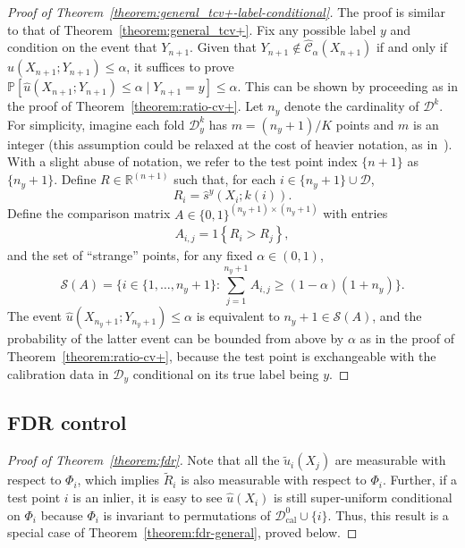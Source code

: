 \documentclass[11pt]{article}
\renewcommand{\P}[1]{\mathbb{P}\left[#1\right]}
\begin{document}
\begin{proof}[Proof of Theorem~\ref{theorem:general_tcv+-label-conditional}]
The proof is similar to that of Theorem~\ref{theorem:general_tcv+}.
Fix any possible label $y$ and condition on the event that $Y_{n+1}$.
Given that $Y_{n+1} \notin \hat{\mathcal{C}}_{\alpha}(X_{n+1})$  if and only if $\hat{u}(X_{n+1}; Y_{n+1}) \leq \alpha$, it suffices to prove $\P{\hat{u}(X_{n+1}; Y_{n+1}) \leq \alpha \mid Y_{n+1} = y} \leq \alpha$. This can be shown by proceeding as in the proof of Theorem~\ref{theorem:ratio-cv+}.
Let $n_y$ denote the cardinality of $\mathcal{D}^k$.
For simplicity, imagine each fold $\mathcal{D}^k_y$ has $m=(n_y+1)/K$ points and $m$ is an integer (this assumption could be relaxed at the cost of heavier notation, as in~\cite{barber2019predictive}).
With a slight abuse of notation, we refer to the test point index $\{n+1\}$ as $\{n_y+1\}$.
Define $R \in \mathbb{R}^{(n+1)}$ such that, for each $i \in \{n_y+1\} \cup \mathcal{D}$,
\begin{equation*}
    R_{i}=\hat{s}^y(X_{i}; k(i)).
\end{equation*}
Define the comparison matrix $A \in \{0,1\}^{(n_y+1)\times(n_y+1)}$ with entries
\begin{align*}
    A_{i,j} = 1\left\{ R_{i} > R_{j}\right\},
\end{align*}
and the set of ``strange'' points, for any fixed $\alpha \in (0,1)$,
\begin{equation*}
    \mathcal{S}(A)=\bigg\{i \in \{1, \dots, n_y+1\}: \sum_{j=1}^{n_y+1}A_{i,j} \geq (1-\alpha)(1+n_y) \bigg\}.
\end{equation*}
The event $\hat{u}(X_{n_y+1}; Y_{n_y+1}) \leq \alpha$ is equivalent to $n_y+1 \in \mathcal{S}(A)$, and the probability of the latter event can be bounded from above by $\alpha$ as in the proof of Theorem~\ref{theorem:ratio-cv+}, because the test point is exchangeable with the calibration data in $\mathcal{D}_{y}$ conditional on its true label being $y$.
\end{proof}


\subsection{FDR control}

\begin{proof}[Proof of Theorem~\ref{theorem:fdr}]
Note that all the $\tilde{u}_{i}(X_j)$ are measurable with respect to $\Phi_i$, which implies $\tilde{R}_i$ is also measurable with respect to $\Phi_i$.
Further, if a test point $i$ is an inlier, it is easy to see $\hat{u}(X_i)$ is still super-uniform conditional on $\Phi_i$ because $\Phi_i$ is invariant to permutations of $\mathcal{D}^0_{\mathrm{cal}} \cup \{i\}$.
Thus, this result is a special case of Theorem~\ref{theorem:fdr-general}, proved below.
\end{proof}
\end{document}
